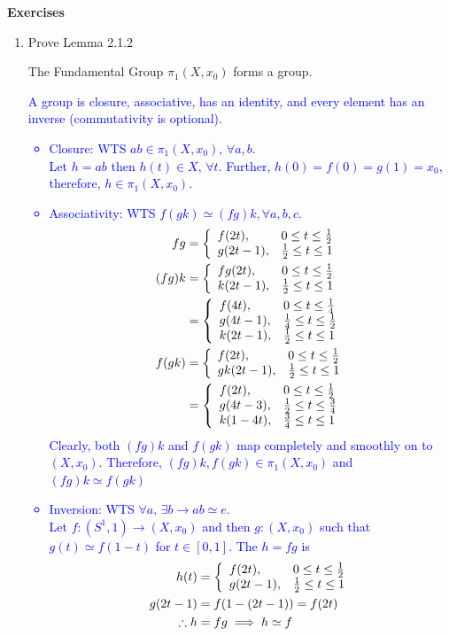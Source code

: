 \documentclass[12pt,a4paper]{report}
\newcommand{\BLUE}[1]{\textcolor{blue}{#1}}
\newenvironment{mylemma}[1]
  {\renewcommand\theinnercustomthm{#1}\innercustomthm}
  {\endinnercustomthm}
\begin{document}
\noindent\textbf{Exercises}
\begin{enumerate}[label=2.7.\arabic*]

\item  Prove Lemma 2.1.2

\begin{mylemma}{2.1.2}The Fundamental Group $\pi_1(X,x_0)$ forms a group.
\end{mylemma}

\BLUE{A group is closure, associative, has an identity, and every element has an inverse (commutativity is optional).
\begin{itemize}
	\item Closure: WTS $ab \in \pi_1(X, x_0),\,\forall a,b$.\\
	Let $h=ab$ then $h(t) \in X, \, \forall t$.  Further, $h(0) = f(0) = g(1) = x_0$, therefore, $h \in \pi_1(X,x_0)$.
	\item Associativity: WTS $f(gk)\simeq(fg)k, \forall a,b,c$.\\	
	\begin{align*}
		fg &= \left \{ \begin{array}{ll} f(2t), & 0\le t \le \frac{1}{2}\\ g(2t-1), & \frac{1}{2}\le t \le 1 \end{array} \right . \\
		(fg)k &= \left \{ \begin{array}{ll} fg(2t), & 0\le t \le \frac{1}{2}\\ k(2t-1), & \frac{1}{2}\le t \le 1 \end{array} \right . \\
		&= \left \{ \begin{array}{ll} f(4t), & 0\le t \le \frac{1}{4}\\ g(4t-1), & \frac{1}{4}\le t \le \frac{1}{2} \\ k(2t-1), & \frac{1}{2}\le t \le 1 \end{array} \right . \\
		f(gk) &= \left \{ \begin{array}{ll} f(2t), & 0\le t \le \frac{1}{2}\\ gk(2t-1), & \frac{1}{2}\le t \le 1 \end{array} \right . \\
		&= \left \{ \begin{array}{ll} f(2t), & 0\le t \le \frac{1}{2}\\ g(4t-3), & \frac{1}{2}\le t \le \frac{3}{4} \\ k(1-4t), & \frac{3}{4}\le t \le 1 \end{array} \right . 
	\end{align*}Clearly, both $(fg)k$ and $f(gk)$ map completely and smoothly on to $(X, x_0)$.  Therefore, $(fg)k,f(gk) \in\pi_1(X,x_0)$ and $(fg)k\simeq f(gk)$
	\item Inversion: WTS $\forall a,\, \exists b \to ab\simeq e$.\\
	Let $f : (S^1,1) \to (X, x_0)$ and then $g: (X, x_0)$ such that $g(t) \simeq f(1-t)$ for $t\in [0,1]$.  The $h=fg$ is 
	\begin{align*}
		h(t) &= \BINDEF{f(2t), & 0\le t \le \frac{1}{2}}{g(2t-1), & \frac{1}{2}\le t \le 1} \\
		g(2t-1) &= f(1-(2t-1)) = f(2t) \\
		\therefore h &= fg \implies h \simeq f

\end{align*}
\end{itemize}}
\end{enumerate}
\end{document}
